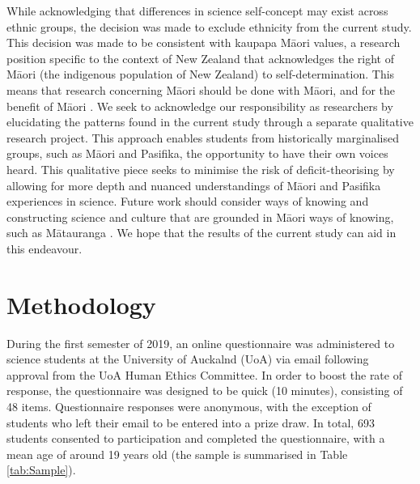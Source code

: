 While acknowledging that differences in science self-concept may exist across ethnic groups, the decision was made to exclude ethnicity from the current study. This decision was made to be consistent with kaupapa M\={a}ori values, a research position specific to the context of New Zealand that acknowledges the right of M\={a}ori (the indigenous population of New Zealand) to self-determination. This means that research concerning M\={a}ori should be done with M\={a}ori, and for the benefit of M\={a}ori \citep{walker2006exploration}. We seek to acknowledge our responsibility as researchers by elucidating the patterns found in the current study through a separate qualitative research project. This approach enables students from historically marginalised groups, such as M\={a}ori and Pasifika, the opportunity to have their own voices heard. This qualitative piece seeks to minimise the risk of deficit-theorising by allowing for more depth and nuanced understandings of M\={a}ori and Pasifika experiences in science. Future work should consider ways of knowing and constructing science and culture that are grounded in M\={a}ori ways of knowing, such as M\={a}tauranga \citep{hikuroa2017matauranga}. We hope that the results of the current study can aid in this endeavour.

\section*{Methodology}
\label{method}
During the first semester of 2019, an online questionnaire was administered to science students at the University of Auckalnd (UoA) via email following approval from the UoA Human Ethics Committee. In order to boost the rate of response, the questionnaire was designed to be quick (10 minutes), consisting of 48 items. Questionnaire responses were anonymous, with the exception of students who left their email to be entered into a prize draw. In total, 693 students consented to participation and completed the questionnaire, with a mean age of around 19 years old (the sample is summarised in Table \ref{tab:Sample}). 

